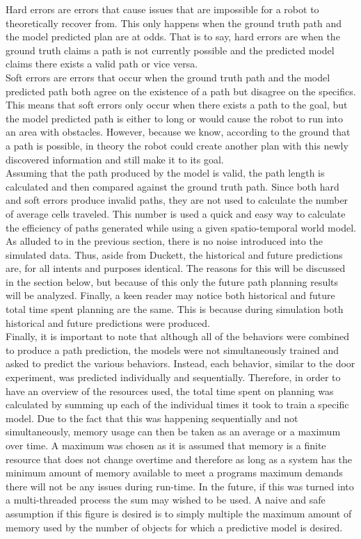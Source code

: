 Hard errors are errors that cause issues that are impossible for
a robot to theoretically recover from. This only happens when the ground truth
path and the model predicted plan are at odds. That is to say, hard errors are
when the ground truth claims a path is not currently possible and the predicted
model claims there exists a valid path or vice versa. \\

Soft errors are errors that occur when the ground truth path and the model
predicted path both agree on the existence of a path but disagree on the
specifics. This means that soft errors only occur when there exists a path
to the goal, but the model predicted path is either to long or would cause
the robot to run into an area with obstacles. However, because we know,
according to the ground that a path is possible, in theory the robot could
create another plan with this newly discovered information and still make it
to its goal. \\

Assuming that the path produced by the model is valid, the path
length is calculated and then compared against the ground truth path. Since
both hard and soft errors produce invalid paths, they are not used to
calculate the number of average cells traveled. This number is used a quick and
easy way to calculate the efficiency of paths generated while using a given
spatio-temporal world model. \\

As alluded to in the previous section, there is no noise introduced
into the simulated data. Thus, aside from Duckett, the historical and future
predictions are, for all intents and purposes identical. The reasons for this
will be discussed in the section below, but because of this only the future
path planning results will be analyzed. Finally, a keen reader may notice both
historical and future total time spent planning are the same. This is because
during simulation both historical and future predictions were produced. \\

Finally, it is important to note that although all of the behaviors were
combined to produce a path prediction, the models were not simultaneously
trained and asked to predict the various behaviors. Instead, each behavior,
similar to the door experiment, was predicted individually and sequentially.
Therefore, in order to have an overview of the resources used, the total
time spent on planning was calculated by summing up each of the individual
times it took to train a specific model. Due to the fact that this was happening
sequentially and not simultaneously, memory usage can then be taken as an
average or a maximum over time. A maximum was chosen as it is assumed that
memory is a finite resource that does not change overtime and therefore as long
as a system has the minimum amount of memory available to meet a programs
maximum demands there will not be any issues during run-time. In the future,
if this was turned into a multi-threaded process the sum may wished to be
used. A naive and safe assumption if this figure is desired is to simply
multiple the maximum amount of memory used by the number of objects for which
a predictive model is desired. \\

